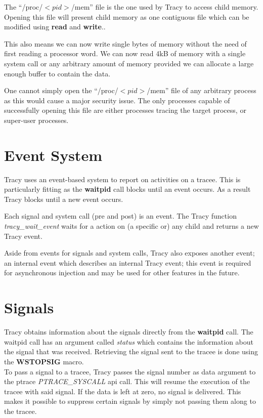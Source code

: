 \documentclass[a4paper, 10pt]{report}
\begin{document}
The ``/proc/$<pid>$/mem'' file is the one used by Tracy to access child memory.
Opening this file will present child memory as one contiguous file which
can be modified using \textbf{read} and \textbf{write}..

This also means we can now write single bytes of memory without the need
of first reading a processor word. We can now read 4kB of memory with a
single system call or any arbitrary amount of memory provided we can allocate
a large enough buffer to contain the data.

One cannot simply open the ``/proc/$<pid>$/mem'' file of any
arbitrary process as this would cause a major security issue. The only
processes capable of successfully opening this file are either processes
tracing the target process, or super-user processes.

\section{Event System}
\label{event-system}

Tracy uses an event-based system to report on activities on a tracee. This is
particularly fitting as the \textbf{waitpid} call blocks until an event
occurs. As a result Tracy blocks until a new event occurs.

Each signal and system call (pre and post) is an event.
The Tracy function \textit{tracy\_wait\_event} waits for a action on
(a specific or) any child and returns a new Tracy event.

Aside from events for signals and system calls, Tracy also exposes another
event; an internal event which describes an internal Tracy event; this event
is required for asynchronous injection and may be used for other features in
the future.

\section{Signals}

Tracy obtains information about the signals directly from the
\textbf{waitpid} call. The waitpid call has an argument called
\textit{status} which contains the information about the signal that was
received. Retrieving the signal sent to the tracee is done using the
\textbf{WSTOPSIG} macro. \\

To pass a signal to a tracee, Tracy passes the signal number as data
argument to the ptrace \textit{PTRACE\_SYSCALL} api call. This will
resume the execution of the tracee with said signal. If the data is
left at zero, no signal is delivered. This makes it possible to
suppress certain signals by simply not passing them along to the tracee.
\end{document}
